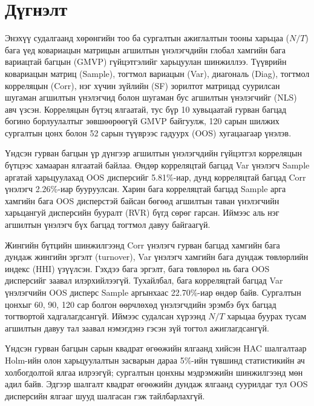 \section{Дүгнэлт}
\label{sec:conclusion}

Энэхүү судалгаанд хөрөнгийн тоо ба сургалтын ажиглалтын тооны харьцаа ($N/T$) бага үед ковариацын матрицын агшилтын үнэлэгчдийн глобал хамгийн бага вариацтай багцын (GMVP) гүйцэтгэлийг харьцуулан шинжиллээ. Түүврийн ковариацын матриц (Sample), тогтмол вариацын (Var), диагональ (Diag), тогтмол корреляцын (Corr), нэг хүчин зүйлийн (SF) зорилтот матрицад суурилсан шугаман агшилтын үнэлэгчид болон шугаман бус агшилтын үнэлэгчийг (NLS) авч үзсэн. Корреляцын бүтэц ялгаатай, тус бүр 10 хувьцаатай гурван багцад богино борлуулалтыг зөвшөөрөөгүй GMVP байгуулж, 120 сарын шилжих сургалтын цонх болон 52 сарын түүврээс гадуурх (OOS) хугацаагаар үнэлэв.

Үндсэн гурван багцын үр дүнгээр агшилтын үнэлэгчдийн гүйцэтгэл корреляцын бүтцээс хамааран ялгаатай байлаа. Өндөр корреляцтай багцад Var үнэлэгч Sample аргатай харьцуулахад OOS дисперсийг 5.81\%-иар, дунд корреляцтай багцад Corr үнэлэгч 2.26\%-иар бууруулсан. Харин бага корреляцтай багцад Sample арга хамгийн бага OOS дисперстэй байсан бөгөөд агшилтын таван үнэлэгчийн харьцангуй дисперсийн бууралт (RVR) бүгд сөрөг гарсан. Иймээс аль нэг агшилтын үнэлэгч бүх багцад тогтмол давуу байгаагүй.

Жингийн бүтцийн шинжилгээнд Corr үнэлэгч гурван багцад хамгийн бага дундаж жингийн эргэлт (turnover), Var үнэлэгч хамгийн бага дундаж төвлөрлийн индекс (HHI) үзүүлсэн. Гэхдээ бага эргэлт, бага төвлөрөл нь бага OOS дисперсийг заавал илэрхийлээгүй. Тухайлбал, бага корреляцтай багцад Var үнэлэгчийн OOS дисперс Sample аргынхаас 22.70\%-иар өндөр байв. Сургалтын цонхыг 60, 90, 120 сар болгон өөрчлөхөд үнэлэгчдийн эрэмбэ бүх багцад тогтвортой хадгалагдсангүй. Иймээс судалсан хүрээнд $N/T$ харьцаа буурах тусам агшилтын давуу тал заавал нэмэгдэнэ гэсэн зүй тогтол ажиглагдсангүй.

Үндсэн гурван багцын сарын квадрат өгөөжийн ялгаанд хийсэн HAC шалгалтаар Holm-ийн олон харьцуулалтын засварын дараа 5\%-ийн түвшинд статистикийн ач холбогдолтой ялгаа илрээгүй; сургалтын цонхны мэдрэмжийн шинжилгээнд мөн адил байв. Эдгээр шалгалт квадрат өгөөжийн дундаж ялгаанд суурилдаг тул OOS дисперсийн ялгааг шууд шалгасан гэж тайлбарлахгүй.

